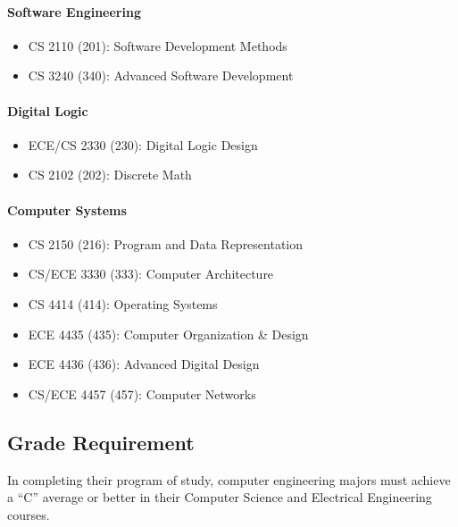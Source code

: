 \documentclass[10pt,letter]{book}
\newenvironment{itemlist}{
\begin{itemize}
\setlength{\itemsep}{0pt}
\setlength{\parskip}{0pt}}
{\end{itemize}}
\begin{document}
\paragraph{Software Engineering}
\begin{itemlist}
\item CS 2110 (201): Software Development Methods
\item CS 3240 (340): Advanced Software Development
\end{itemlist}

\paragraph{Digital Logic}
\begin{itemlist}
\item ECE/CS 2330 (230): Digital Logic Design
\item CS 2102 (202): Discrete Math
\end{itemlist}

\paragraph{Computer Systems}
\begin{itemlist}
\item CS 2150 (216): Program and Data Representation
\item CS/ECE 3330 (333): Computer Architecture
\item CS 4414 (414): Operating Systems
\item ECE 4435 (435): Computer Organization \& Design
\item ECE 4436 (436): Advanced Digital Design
\item CS/ECE 4457 (457): Computer Networks
\end{itemlist}

\subsection{Grade Requirement}
In completing their program of study, computer
engineering majors must achieve a “C” average or
better in their Computer Science and Electrical
Engineering courses.


\end{document}
